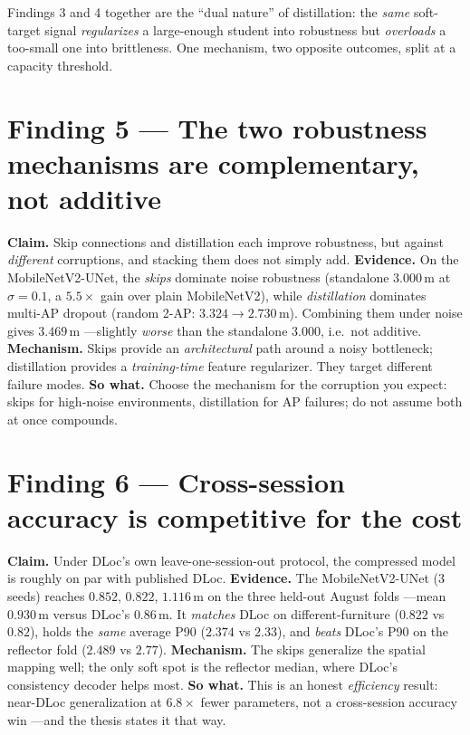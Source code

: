 \begin{keyidea}
Findings 3 and 4 together are the ``dual nature'' of distillation: the \emph{same} soft-target signal
\emph{regularizes} a large-enough student into robustness but \emph{overloads} a too-small one into
brittleness. One mechanism, two opposite outcomes, split at a capacity threshold.
\end{keyidea}

\section{Finding 5 --- The two robustness mechanisms are complementary, not additive}
\label{sec:find:5}

\textbf{Claim.} Skip connections and distillation each improve robustness, but against \emph{different}
corruptions, and stacking them does not simply add. \textbf{Evidence.} On the MobileNetV2-UNet, the
\emph{skips} dominate noise robustness (standalone $3.000$\,m at $\sigma{=}0.1$, a $5.5\times$ gain over
plain MobileNetV2), while \emph{distillation} dominates multi-AP dropout (random 2-AP:
$3.324\to2.730$\,m). Combining them under noise gives $3.469$\,m ---slightly \emph{worse} than the
standalone $3.000$, i.e.\ not additive. \textbf{Mechanism.} Skips provide an \emph{architectural} path
around a noisy bottleneck; distillation provides a \emph{training-time} feature regularizer. They
target different failure modes. \textbf{So what.} Choose the mechanism for the corruption you expect:
skips for high-noise environments, distillation for AP failures; do not assume both at once compounds.

\section{Finding 6 --- Cross-session accuracy is competitive for the cost}
\label{sec:find:6}

\textbf{Claim.} Under DLoc's own leave-one-session-out protocol, the compressed model is roughly on par
with published DLoc. \textbf{Evidence.} The MobileNetV2-UNet (3 seeds) reaches $0.852$, $0.822$,
$1.116$\,m on the three held-out August folds ---mean $0.930$\,m versus DLoc's $0.86$\,m. It
\emph{matches} DLoc on different-furniture ($0.822$ vs $0.82$), holds the \emph{same} average P90
($2.374$ vs $2.33$), and \emph{beats} DLoc's P90 on the reflector fold ($2.489$ vs $2.77$).
\textbf{Mechanism.} The skips generalize the spatial mapping well; the only soft spot is the reflector
median, where DLoc's consistency decoder helps most. \textbf{So what.} This is an honest
\emph{efficiency} result: near-DLoc generalization at $6.8\times$ fewer parameters, not a cross-session
accuracy win ---and the thesis states it that way.

